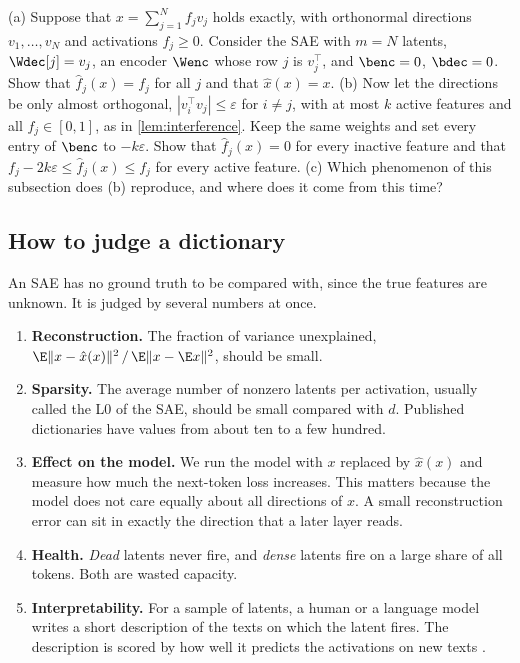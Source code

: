 \begin{exercise}\label{ex:perfect}
(a) Suppose that $x=\sum_{j=1}^{N}f_jv_j$ holds exactly, with orthonormal directions $v_1,\dots,v_N$ and
activations $f_j\ge0$. Consider the SAE with $m=N$ latents, $\Wdec[j]=v_j$, an encoder $\Wenc$ whose row $j$ is
$v_j^\top$, and $\benc=0$, $\bdec=0$. Show that $\hat f_j(x)=f_j$ for all $j$ and that $\hat x(x)=x$. (b) Now let
the directions be only almost orthogonal, $|v_i^\top v_j|\le\varepsilon$ for $i\ne j$, with at most $k$ active
features and all $f_j\in[0,1]$, as in \cref{lem:interference}. Keep the same weights and set every entry of
$\benc$ to $-k\varepsilon$. Show that $\hat f_j(x)=0$ for every inactive feature and that
$f_j-2k\varepsilon\le\hat f_j(x)\le f_j$ for every active feature. (c) Which phenomenon of this subsection does
(b) reproduce, and where does it come from this time?
\end{exercise}

\subsection{How to judge a dictionary}
\label{sec:saeeval}

An SAE has no ground truth to be compared with, since the true features are unknown. It is judged by several
numbers at once.

\begin{enumerate}
\item \textbf{Reconstruction.} The fraction of variance unexplained,
$\E\|x-\hat x(x)\|^2\,/\,\E\|x-\E x\|^2$, should be small.
\item \textbf{Sparsity.} The average number of nonzero latents per activation, usually called the L0 of the SAE, should be
small compared with $d$. Published dictionaries have values from about ten to a few hundred.
\item \textbf{Effect on the model.} We run the model with $x$ replaced by $\hat x(x)$ and measure how much the
next-token loss increases. This matters because the model does not care equally about all directions of $x$. A
small reconstruction error can sit in exactly the direction that a later layer reads.
\item \textbf{Health.} \emph{Dead} latents never fire, and \emph{dense} latents fire on a large share of all
tokens. Both are wasted capacity.
\item \textbf{Interpretability.} For a sample of latents, a human or a language model writes a short
description of the texts on which the latent fires. The description is scored by how well it predicts the
activations on new texts \citep{bills2023language}.
\end{enumerate}

